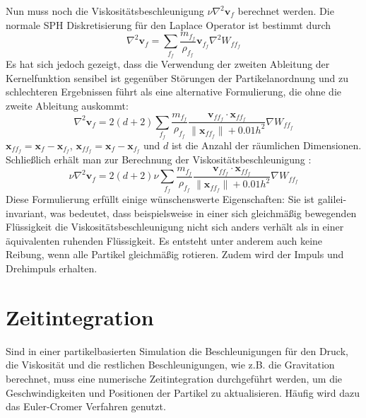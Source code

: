 \documentclass{scrreprt}
\begin{document}
Nun muss noch die Viskositätsbeschleunigung $\nu \nabla^2 \textbf{v}_f$ berechnet werden.
Die normale SPH Diskretisierung für den Laplace Operator ist bestimmt durch
\begin{equation}
    \nabla^2 \textbf{v}_f = \sum_{f_f} \frac{m_{f_f}}{\rho_{f_f}} \textbf{v}_{f_f} \nabla^2 W_{ff_f}
\end{equation}
Es hat sich jedoch gezeigt,
dass die Verwendung der zweiten Ableitung der Kernelfunktion sensibel ist gegenüber Störungen der Partikelanordnung
und zu schlechteren Ergebnissen führt als eine alternative Formulierung, die ohne die zweite Ableitung auskommt:
\begin{equation}
    \nabla^2 \textbf{v}_f = 2(d + 2) \sum_{f_f} \frac{m_{f_f}}{\rho_{f_f}} \frac{\textbf{v}_{ff_f} \cdot \textbf{x}_{ff_f}}{\|\textbf{x}_{ff_f}\| + 
    0.01h^2} \nabla W_{ff_f}
\end{equation}
$\textbf{x}_{ff_f} = \textbf{x}_f - \textbf{x}_{f_f}$, $\textbf{x}_{ff_f} = \textbf{x}_f - \textbf{x}_{f_f}$ und $d$ ist die Anzahl der räumlichen Dimensionen.
Schließlich erhält man zur Berechnung der Viskositätsbeschleunigung \cite{koschier_smoothed_2020}:
\begin{equation}
    \nu \nabla^2 \textbf{v}_f = 2(d + 2) \nu \sum_{f_f} \frac{m_{f_f}}{\rho_{f_f}} \frac{\textbf{v}_{ff_f} \cdot \textbf{x}_{ff_f}}{\|\textbf{x}_{ff_f}\| + 
    0.01h^2} \nabla W_{ff_f}
\end{equation}
Diese Formulierung erfüllt einige wünschenswerte Eigenschaften:
Sie ist galilei-invariant, was bedeutet, dass beispielsweise in einer sich gleichmäßig bewegenden Flüssigkeit
die Viskositätsbeschleunigung nicht sich anders verhält als in einer äquivalenten ruhenden Flüssigkeit.
Es entsteht unter anderem auch keine Reibung, wenn alle Partikel gleichmäßig rotieren.
Zudem wird der Impuls und Drehimpuls erhalten.


\section{Zeitintegration}
Sind in einer partikelbasierten Simulation die Beschleunigungen für den Druck, die Viskosität und die restlichen Beschleunigungen, wie z.B. die Gravitation berechnet,
muss eine numerische Zeitintegration durchgeführt werden, um die Geschwindigkeiten und Positionen der Partikel zu aktualisieren.
Häufig wird dazu das Euler-Cromer Verfahren genutzt. \cite{koschier_smoothed_2020}
\end{document}
